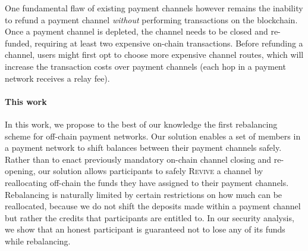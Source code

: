 \documentclass[sigconf]{acmart}
\newcommand{\name}{\textsc{Revive}\xspace}
\begin{document}

One fundamental flaw of existing payment channels however remains the inability to refund a payment channel \emph{without} performing transactions on the blockchain. Once a payment channel is depleted, the channel needs to be closed and re-funded, requiring at least two expensive on-chain transactions. Before refunding a channel, users might first opt to choose more expensive channel routes, which will increase the transaction costs over payment channels (each hop in a payment network receives a relay fee).

\paragraph{This work} In this work, we propose to the best of our knowledge the first rebalancing scheme for off-chain payment networks. Our solution enables a set of members in a payment network to shift balances between their payment channels safely. Rather than to enact previously mandatory on-chain channel closing and re-opening, our solution allows participants to safely \name a channel by reallocating off-chain the funds they have assigned to their payment channels. Rebalancing is naturally limited by certain restrictions on how much can be reallocated, because we do not shift the deposits made within a payment channel but rather the credits that participants are entitled to. In our security analysis, we show that an honest participant is guaranteed not to lose any of its funds while rebalancing.
\end{document}
